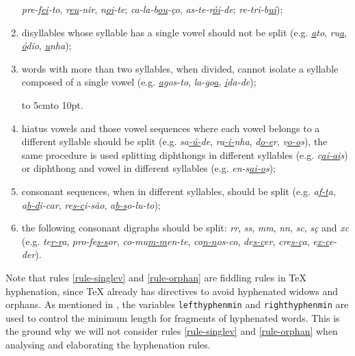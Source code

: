 \documentclass{article}
\begin{document}
\begin{enumerate}
	\emph{pre-f\underline{\emph{ei}}-to}, \emph{r\underline{\emph{eu}}-nir},
	\emph{n\underline{\emph{oi}}-te}; \emph{ca-la-b\underline{\emph{ou}}-ço}, 
	\emph{as-te-r\underline{\emph{ói}}-de}; 
	\emph{re-tri-b\underline{\emph{ui}}});
    \item\label{rule-singlev} disyllables whose syllable has a single vowel should 
	not be split (e.g. \emph{\underline{\emph{a}}to}, \emph{ru\underline{\emph{a}}}, 
	\emph{\underline{\emph{ó}}dio}, \emph{\underline{\emph{u}}nha});
    \item\label{rule-orphan} words with more than two syllables, when divided, cannot 
	isolate a syllable composed of a single vowel (e.g. \emph{\underline{\emph{a}}gos-to}, 
	\emph{la-go\underline{\emph{a}}}, \emph{\underline{\emph{i}}da-de});


    \hspace{10em} \hbox to 5cm{\leaders\hbox to 10pt{\hss . \hss}\hfil} 

    \item\label{rule-hiatus} hiatus vowels and those vowel sequences where each vowel
	belongs to a different syllable should be split (e.g.
	\emph{sa\underline{\emph{-ú-}}de}, \emph{ra\underline{\emph{-i-}}nha}, \emph{d\underline{\emph{o-e}}r},
	\emph{v\underline{\emph{o-o}}s}), the same procedure is used splitting diphthongs
	in different syllables (e.g. \emph{c\underline{\emph{ai-ai}}s}) or diphthong and
	vowel in different syllables (e.g. \emph{en-s\underline{\emph{ai-o}}s});
    \item\label{rule-consonants} consonant sequences, when in different syllables, should
	be split (e.g. \emph{a\underline{\emph{f-t}}a}, \emph{a\underline{\emph{b-d}}i-car},
	\emph{re\underline{\emph{s-c}}i-são}, \emph{a\underline{\emph{b-s}}o-lu-to});
    \item\label{rule-digraphs} the following consonant digraphs should be split:
	\emph{rr}, \emph{ss}, \emph{mm}, \emph{nn}, \emph{sc}, \emph{sç} and
	\emph{xc} (e.g. \emph{te\underline{\emph{r-r}}a}, \emph{pro-fe\underline{\emph{s-s}}or},
	\emph{co-mu\underline{\emph{m-m}}en-te}, \emph{co\underline{\emph{n-n}}os-co},
	\emph{de\underline{\emph{s-c}}er}, \emph{cre\underline{\emph{s-ç}}a}, \emph{e\underline{\emph{x-c}}e-der}).
\end{enumerate}

Note that rules \ref{rule-singlev} and \ref{rule-orphan} are fiddling rules in \TeX{} hyphenation, 
since \TeX{} already has directives to avoid hyphenated widows and orphans. 
As mentioned in , the variables \verb|lefthyphenmin| and \verb|righthyphenmin|
are used to control the minimum length for fragments of hyphenated words.
This is the ground why we will not consider rules \ref{rule-singlev} and \ref{rule-orphan}
when analysing and elaborating the hyphenation rules.
\end{document}
